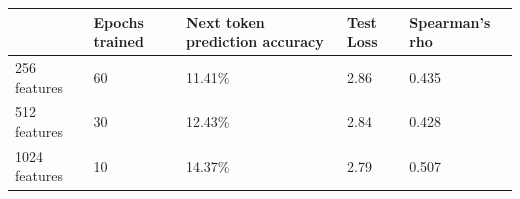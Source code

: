 \begin{table}[!ht]
\begin{tabular}{|l|l|l|l|l|}
\hline
              & Epochs trained & Next token prediction accuracy & Test Loss & Spearman's rho\\ \hline
256 features  & 60             & 11.41\%                        & 2.86      & 0.435         \\ \hline
512 features  & 30             & 12.43\%                        & 2.84      & 0.428         \\ \hline
1024 features & 10             & 14.37\%                        & 2.79      & 0.507         \\ \hline
\end{tabular}
\end{table}